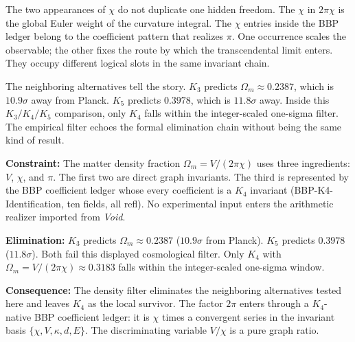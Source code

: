 \documentclass[11pt,a4paper]{book}
\def\texttt#1{#1}%
\begin{document}
The two appearances of $\chi$ do not duplicate one hidden freedom. The $\chi$ in $2\pi\chi$ is the global Euler weight of the curvature integral. The $\chi$ entries inside the BBP ledger belong to the coefficient pattern that realizes $\pi$. One occurrence scales the observable; the other fixes the route by which the transcendental limit enters. They occupy different logical slots in the same invariant chain.

The neighboring alternatives tell the story. $K_3$ predicts $\Omega_m \approx 0.2387$, which is $10.9\sigma$ away from Planck. $K_5$ predicts $0.3978$, which is $11.8\sigma$ away. Inside this $K_3/K_4/K_5$ comparison, only $K_4$ falls within the integer-scaled one-sigma filter. The empirical filter echoes the formal elimination chain without being the same kind of result.

\textbf{Constraint:} The matter density fraction $\Omega_m = V/(2\pi\chi)$ uses three ingredients: $V$, $\chi$, and $\pi$. The first two are direct graph invariants. The third is represented by the BBP coefficient ledger whose every coefficient is a $K_4$ invariant (\texttt{BBP-K4-Identification}, ten fields, all \texttt{refl}). No experimental input enters the arithmetic realizer imported from \textit{Void}.

\textbf{Elimination:} $K_3$ predicts $\Omega_m \approx 0.2387$ ($10.9\sigma$ from Planck). $K_5$ predicts $0.3978$ ($11.8\sigma$). Both fail this displayed cosmological filter. Only $K_4$ with $\Omega_m = V/(2\pi\chi) \approx 0.3183$ falls within the integer-scaled one-sigma window.

\textbf{Consequence:} The density filter eliminates the neighboring alternatives tested here and leaves $K_4$ as the local survivor. The factor $2\pi$ enters through a $K_4$-native BBP coefficient ledger: it is $\chi$ times a convergent series in the invariant basis $\{\chi, V, \kappa, d, E\}$. The discriminating variable $V/\chi$ is a pure graph ratio.
\end{document}
